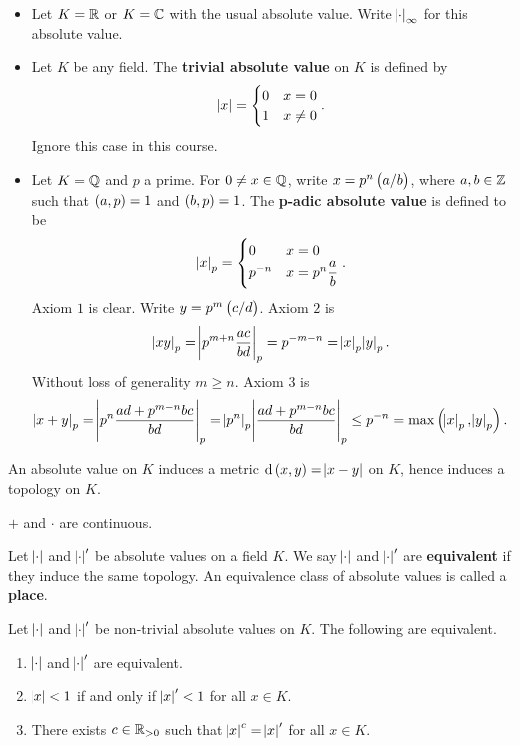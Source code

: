 \begin{example*}
\hfill
\begin{itemize}
\item Let $ K = \mathbb{R} $ or $ K = \mathbb{C} $ with the usual absolute value. Write $ \abs{\cdot}_\infty $ for this absolute value.
\item Let $ K $ be any field. The \textbf{trivial absolute value} on $ K $ is defined by
$$ \abs{x} =
\begin{cases}
0 & x = 0 \\
1 & x \ne 0
\end{cases}.
$$
Ignore this case in this course.
\item Let $ K = \mathbb{Q} $ and $ p $ a prime. For $ 0 \ne x \in \mathbb{Q} $, write $ x = p^n\br{a / b} $, where $ a, b \in \mathbb{Z} $ such that $ \br{a, p} = 1 $ and $ \br{b, p} = 1 $. The \textbf{p-adic absolute value} is defined to be
$$ \abs{x}_p =
\begin{cases}
0 & x = 0 \\
p^{-n} & x = p^n\dfrac{a}{b}
\end{cases}.
$$
Axiom $ 1 $ is clear. Write $ y = p^m\br{c / d} $. Axiom $ 2 $ is
$$ \abs{xy}_p = \abs{p^{m + n}\dfrac{ac}{bd}}_p = p^{-m - n} = \abs{x}_p\abs{y}_p. $$
Without loss of generality $ m \ge n $. Axiom $ 3 $ is
$$ \abs{x + y}_p = \abs{p^n\dfrac{ad + p^{m - n}bc}{bd}}_p = \abs{p^n}_p\abs{\dfrac{ad + p^{m - n}bc}{bd}}_p \le p^{-n} = \max\br{\abs{x}_p, \abs{y}_p}. $$
\end{itemize}
\end{example*}

An absolute value on $ K $ induces a metric $ \d\br{x, y} = \abs{x - y} $ on $ K $, hence induces a topology on $ K $.

\begin{exercise*}
$ + $ and $ \cdot $ are continuous.
\end{exercise*}

\begin{definition}
Let $ \abs{\cdot} $ and $ \abs{\cdot}' $ be absolute values on a field $ K $. We say $ \abs{\cdot} $ and $ \abs{\cdot}' $ are \textbf{equivalent} if they induce the same topology. An equivalence class of absolute values is called a \textbf{place}.
\end{definition}

\pagebreak

\begin{proposition}
Let $ \abs{\cdot} $ and $ \abs{\cdot}' $ be non-trivial absolute values on $ K $. The following are equivalent.
\begin{enumerate}
\item $ \abs{\cdot} $ and $ \abs{\cdot}' $ are equivalent.
\item $ \abs{x} < 1 $ if and only if $ \abs{x}' < 1 $ for all $ x \in K $.
\item There exists $ c \in \mathbb{R}_{> 0} $ such that $ \abs{x}^c = \abs{x}' $ for all $ x \in K $.
\end{enumerate}
\end{proposition}

